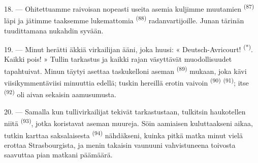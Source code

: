 18. --- Ohitettuamme raivoisan nopeasti useita asemia kuljimme muutamien
 \textsuperscript{(87)} läpi ja jätimme taaksemme
lukemattomia  \textsuperscript{(88)} radanvartijoille.
Junan tärinän tuudittamana nukahdin syvään.

\VUsaut{3.0mm}
\VUsaut{3.0mm}

19. --- Minut herätti äkkiä virkailijan ääni, joka huusi:
« Deutsch-Avricourt! \textsuperscript{(*)}. Kaikki pois! » Tullin tarkastus ja
kaikki rajan väsyttävät muodollisuudet tapahtuivat. Minun täytyi asettaa
taskukelloni aseman  \textsuperscript{(89)} mukaan, joka
kävi viisikymmentäviisi minuuttia edellä; tuskin hereillä erotin vaivoin
 \textsuperscript{(90)} 
\textsuperscript{(91)}; itse  \textsuperscript{(92)} oli
aivan sekaisin aamusumusta.

20. --- Samalla kun tullivirkailijat tekivät tarkastustaan, tulkitsin haukotellen
niitä  \textsuperscript{(93)}, jotka koristavat aseman
muureja. Söin aamiaisen kuluttaakseni aikaa, tutkin karttaa saksalaisesta
 \textsuperscript{(94)} nähdäkseni, kuinka pitkä matka minut
vielä erottaa Strasbourgista, ja menin takaisin vaunuuni vahvistuneena
toivosta saavuttaa pian matkani päämäärä.
\VUsaut{6.0mm}
\VUfilet{22mm}
